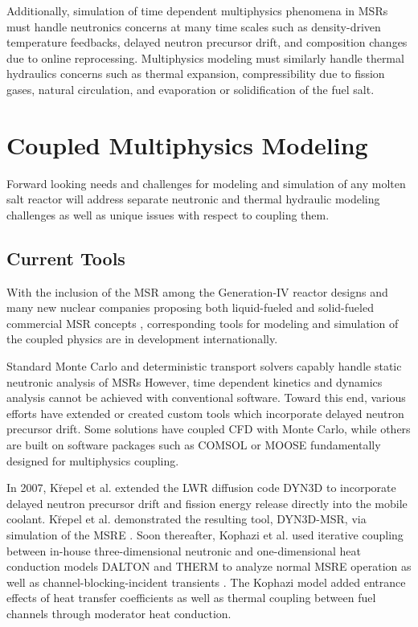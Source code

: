 Additionally, simulation of time dependent multiphysics phenomena in \glspl{MSR} must 
handle neutronics concerns at many time scales such as density-driven 
temperature feedbacks, delayed neutron precursor drift, and composition changes 
due to online reprocessing. Multiphysics modeling must similarly handle thermal hydraulics concerns 
such as thermal expansion, compressibility due to fission gases, natural 
circulation, and evaporation or solidification of the fuel salt.

\section{Coupled Multiphysics Modeling}

Forward looking needs and challenges for modeling and simulation of any molten 
salt reactor will address separate neutronic and thermal hydraulic modeling 
challenges as well as unique issues with respect to coupling them.

\subsection{Current Tools}
With the inclusion of the \gls{MSR} among the Generation-IV reactor designs
\cite{gif_generation_2008,gif_generation_2015} and many new nuclear companies proposing both
liquid-fueled and solid-fueled commercial \gls{MSR} concepts
\cite{hyde_liquid_2015,leblanc_integral_2015,thorcon_-able_2017,scarlat_design_2014,transatomic_power_corporation_neutronics_2016}, 
corresponding tools for modeling and simulation of the coupled physics are in 
development internationally. 

Standard Monte Carlo \cite{leppanen_serpent_2015,werner_mcnp_2017} and deterministic 
\cite{rearden_scale:_2016} 
transport solvers capably handle static neutronic analysis of \glspl{MSR} 
However, time dependent kinetics and dynamics analysis cannot be achieved with 
conventional software. Toward this end, various efforts have extended or 
created custom tools which incorporate delayed neutron precursor drift. 
Some solutions have coupled \gls{CFD} with Monte Carlo, while others are built 
on software packages such as \gls{COMSOL} \cite{comsol_ab_comsol_2018} or 
\gls{MOOSE} \cite{gaston_physics-based_2015,gaston_parallel_2009} fundamentally designed 
for multiphysics coupling. 

In 2007, K\u{r}epel et al. extended the \gls{LWR}
diffusion code DYN3D to incorporate delayed neutron precursor drift and fission 
energy release directly into the mobile coolant. K\u{r}epel et al. demonstrated 
the resulting tool, DYN3D-MSR, via simulation of the \gls{MSRE} \cite{krepel_dyn3d-msr_2007}.
Soon thereafter, Kophazi et al. used iterative coupling between in-house
three-dimensional neutronic and one-dimensional heat conduction models DALTON
and THERM to analyze normal \gls{MSRE} operation as well as
channel-blocking-incident transients \cite{kophazi_development_2009}. The
Kophazi model added entrance effects of heat transfer coefficients as well as
thermal coupling between fuel channels through moderator heat conduction. 

